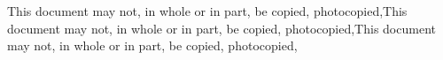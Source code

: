 
	This document may not, in whole or in part, be copied, photocopied,This document may not, in whole or in part, be copied, photocopied,This document may not, in whole or in part, be copied, photocopied,
